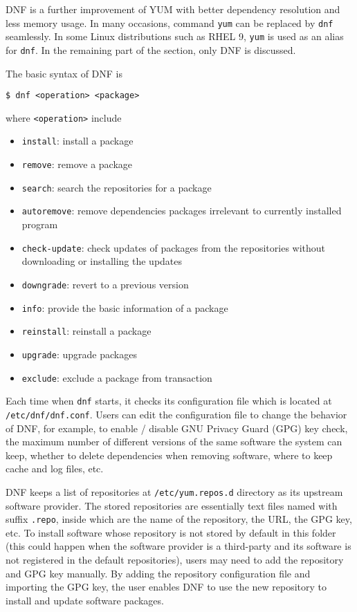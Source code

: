 DNF is a further improvement of YUM with better dependency resolution and less memory usage. In many occasions, command \verb|yum| can be replaced by \verb|dnf| seamlessly. In some Linux distributions such as RHEL 9, \verb|yum| is used as an alias for \verb|dnf|. In the remaining part of the section, only DNF is discussed.

The basic syntax of DNF is
\begin{lstlisting}
$ dnf <operation> <package>
\end{lstlisting}
where \verb|<operation>| include
\begin{itemize}
	\item \verb|install|: install a package
	\item \verb|remove|: remove a package
	\item \verb|search|: search the repositories for a package
	\item \verb|autoremove|: remove dependencies packages irrelevant to currently installed program
	\item \verb|check-update|: check updates of packages from the repositories without downloading or installing the updates
	\item \verb|downgrade|: revert to a previous version
	\item \verb|info|: provide the basic information of a package
	\item \verb|reinstall|: reinstall a package
	\item \verb|upgrade|: upgrade packages
	\item \verb|exclude|: exclude a package from transaction
\end{itemize}

Each time when \verb|dnf| starts, it checks its configuration file which is located at \verb|/etc/dnf/dnf.conf|. Users can edit the configuration file to change the behavior of DNF, for example, to enable / disable GNU Privacy Guard (GPG) key check, the maximum number of different versions of the same software the system can keep, whether to delete dependencies when removing software, where to keep cache and log files, etc.

DNF keeps a list of repositories at \verb|/etc/yum.repos.d| directory as its upstream software provider. The stored repositories are essentially text files named with suffix \verb|.repo|, inside which are the name of the repository, the URL, the GPG key, etc. To install software whose repository is not stored by default in this folder (this could happen when the software provider is a third-party and its software is not registered in the default repositories), users may need to add the repository and GPG key manually. By adding the repository configuration file and importing the GPG key, the user enables DNF to use the new repository to install and update software packages.

